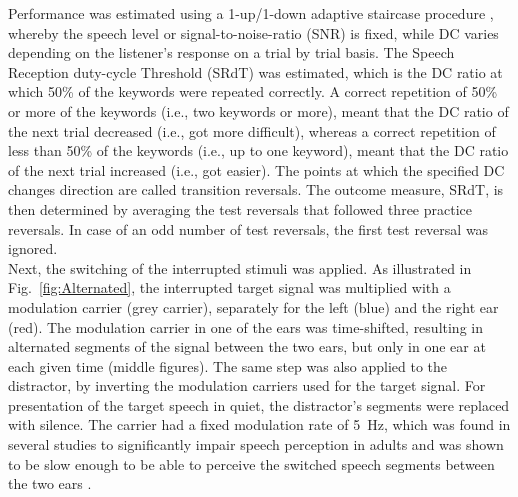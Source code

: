 \documentclass[a4paper, twoside]{templates/ociamthesis}
\begin{document}
Performance was estimated using a 1-up/1-down adaptive staircase procedure \autocite[e.g.,][]{Levitt1971}, whereby the speech level or signal-to-noise-ratio (SNR) is fixed, while DC varies depending on the listener's response on a trial by trial basis. The Speech Reception duty-cycle Threshold (SRdT) was estimated, which is the DC ratio at which 50\% of the keywords were repeated correctly. A correct repetition of 50\% or more of the keywords (i.e., two keywords or more), meant that the DC ratio of the next trial decreased (i.e., got more difficult), whereas a correct repetition of less than 50\% of the keywords (i.e., up to one keyword), meant that the DC ratio of the next trial increased (i.e., got easier). The points at which the specified DC changes direction are called transition reversals. The outcome measure, SRdT, is then determined by averaging the test reversals that followed three practice reversals. In case of an odd number of test reversals, the first test reversal was ignored.\\

Next, the switching of the interrupted stimuli was applied. As illustrated in Fig.~\ref{fig:Alternated}, the interrupted target signal was multiplied with a modulation carrier (grey carrier), separately for the left (blue) and the right ear (red). The modulation carrier in one of the ears was time-shifted, resulting in alternated segments of the signal between the two ears, but only in one ear at each given time (middle figures). The same step was also applied to the distractor, by inverting the modulation carriers used for the target signal. For presentation of the target speech in quiet, the distractor's segments were replaced with silence. The carrier had a fixed modulation rate of 5~Hz, which was found in several studies to significantly impair speech perception in adults and was shown to be slow enough to be able to perceive the switched speech segments between the two ears \autocite{Cherry1954}.\\
\end{document}
